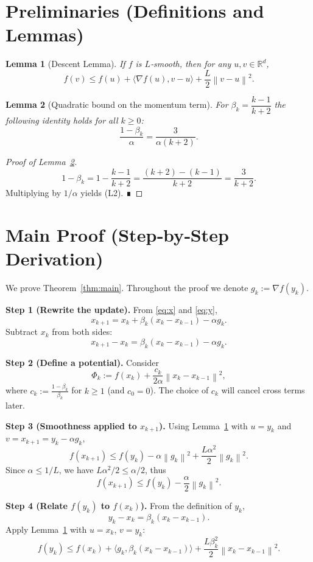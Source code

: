\documentclass{article}
\newtheorem{lemma}{Lemma}
\newcommand{\norm}[1]{\left\lVert #1\right\rVert}
\begin{document}
\section*{Preliminaries (Definitions and Lemmas)}
\begin{lemma}[Descent Lemma]\label{lem:descent}
If $f$ is $L$‑smooth, then for any $u,v\in\mathbb{R}^d$,
\[
f(v)\le f(u)+\langle\nabla f(u),v-u\rangle+\frac{L}{2}\norm{v-u}^2 .
\tag{L1}
\]
\end{lemma}
\begin{lemma}[Quadratic bound on the momentum term]\label{lem:beta}
For $\beta_k=\dfrac{k-1}{k+2}$ the following identity holds for all $k\ge0$:
\[
\frac{1-\beta_k}{\alpha}= \frac{3}{\alpha(k+2)} .
\tag{L2}
\]
\end{lemma}
\begin{proof}[Proof of Lemma~\ref{lem:beta}]
\[
1-\beta_k = 1-\frac{k-1}{k+2}= \frac{(k+2)-(k-1)}{k+2}= \frac{3}{k+2}.
\]
Multiplying by $1/\alpha$ yields (L2). ∎
\end{proof}

\section*{Main Proof (Step‑by‑Step Derivation)}
We prove Theorem~\ref{thm:main}. Throughout the proof we denote $g_k:=\nabla f(y_k)$.

\noindent\textbf{Step 1 (Rewrite the update).}  
From \eqref{eq:x} and \eqref{eq:y},
\[
x_{k+1}=x_k+\beta_k(x_k-x_{k-1})-\alpha g_k .
\tag{3}
\]
Subtract $x_k$ from both sides:
\[
x_{k+1}-x_k = \beta_k (x_k-x_{k-1}) - \alpha g_k .
\tag{4}
\]

\noindent\textbf{Step 2 (Define a potential).}  
Consider
\[
\Phi_k := f(x_k) + \frac{c_k}{2\alpha}\norm{x_k-x_{k-1}}^2,
\]
where $c_k:=\frac{1-\beta_k}{\beta_k}$ for $k\ge1$ (and $c_0=0$).  
The choice of $c_k$ will cancel cross terms later.

\noindent\textbf{Step 3 (Smoothness applied to $x_{k+1}$).}  
Using Lemma~\ref{lem:descent} with $u=y_k$ and $v=x_{k+1}=y_k-\alpha g_k$,
\[
f(x_{k+1}) \le f(y_k) - \alpha \norm{g_k}^2 + \frac{L\alpha^2}{2}\norm{g_k}^2 .
\tag{5}
\]
Since $\alpha\le 1/L$, we have $L\alpha^2/2\le \alpha/2$, thus
\[
f(x_{k+1}) \le f(y_k) - \frac{\alpha}{2}\norm{g_k}^2 .
\tag{6}
\]

\noindent\textbf{Step 4 (Relate $f(y_k)$ to $f(x_k)$).}  
From the definition of $y_k$,
\[
y_k - x_k = \beta_k (x_k-x_{k-1}) .
\tag{7}
\]
Apply Lemma~\ref{lem:descent} with $u=x_k$, $v=y_k$:
\[
f(y_k) \le f(x_k) + \langle g_k, \beta_k (x_k-x_{k-1})\rangle + \frac{L\beta_k^2}{2}\norm{x_k-x_{k-1}}^2 .
\tag{8}
\]
\end{document}

